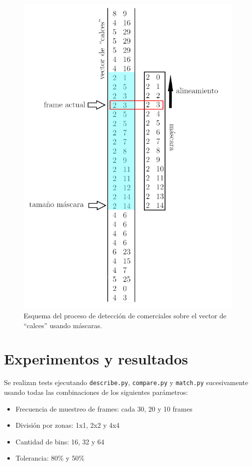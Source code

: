\documentclass[14pt,letterpaper,hidelinks]{extarticle}
\begin{document}
\begin{figure}[ht!]
\centering 
\captionsetup{justification=centering,margin=2cm}
\includegraphics[scale=0.6]{img/matcheo.png}
\caption{Esquema del proceso de detección de comerciales sobre el vector de ``calces'' usando máscaras.\label{fig:match}}
\end{figure} 

\section{Experimentos y resultados}
Se realizan tests ejecutando \verb+describe.py+, \verb+compare.py+ y \verb+match.py+ sucesivamente usando todas las combinaciones de los siguientes parámetros:
\begin{itemize}
\item Frecuencia de muestreo de frames: cada 30, 20 y 10 frames
\item División por zonas: 1x1, 2x2 y 4x4
\item Cantidad de bins: 16, 32 y 64
\item Tolerancia: 80\% y 50\%
\end{itemize}
\end{document}

